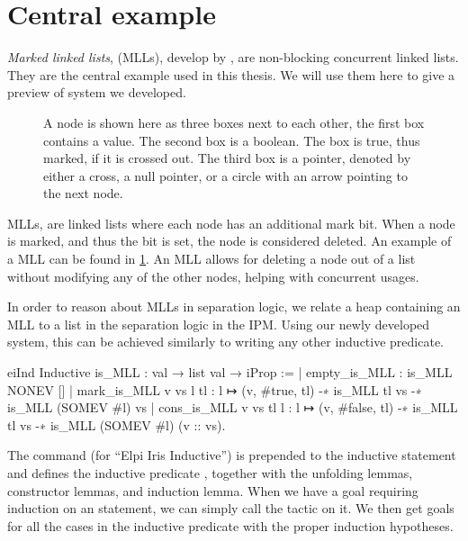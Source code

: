 \documentclass[thesis.tex]{subfiles}
\begin{document}
\section{Central example}
\emph{Marked linked lists}, (MLLs), develop by  \cite{harrisPragmaticImplementationNonblocking2001b}, are non-blocking concurrent linked lists. They are the central example used in this thesis. We will use them here to give a preview of system we developed.
\begin{figure}[t]
  \centering
  \caption{A node is shown here as three boxes next to each other, the first box contains a value. The second box is a boolean. The box is true, thus marked, if it is crossed out. The third box is a pointer, denoted by either a cross, a null pointer, or a circle with an arrow pointing to the next node.}
  \label{fig:MLLdiag}
\end{figure}

MLLs, are linked lists where each node has an additional mark bit. When a node is marked, and thus the bit is set, the node is considered deleted. An example of a MLL can be found in \cref{fig:MLLdiag}. An MLL allows for deleting a node out of a list without modifying any of the other nodes, helping with concurrent usages.

In order to reason about MLLs in separation logic, we relate a heap containing an MLL to a list in the separation logic in the IPM. Using our newly developed system, this can be achieved similarly to writing any other inductive predicate.
\begin{coqcode}
  eiInd
  Inductive is_MLL : val → list val → iProp :=
      | empty_is_MLL : is_MLL NONEV []
      | mark_is_MLL v vs l tl : 
        l ↦ (v, #true, tl) -∗ is_MLL tl vs -∗ 
        is_MLL (SOMEV #l) vs
      | cons_is_MLL v vs tl l : 
        l ↦ (v, #false, tl) -∗ is_MLL tl vs -∗ 
        is_MLL (SOMEV #l) (v :: vs).
\end{coqcode}
The command  (for ``Elpi Iris Inductive'') is prepended to the inductive statement and defines the inductive predicate , together with the unfolding lemmas, constructor lemmas, and induction lemma. When we have a goal requiring induction on an  statement, we can simply call the  tactic on it. We then get goals for all the cases in the inductive predicate with the proper induction hypotheses.
\end{document}
